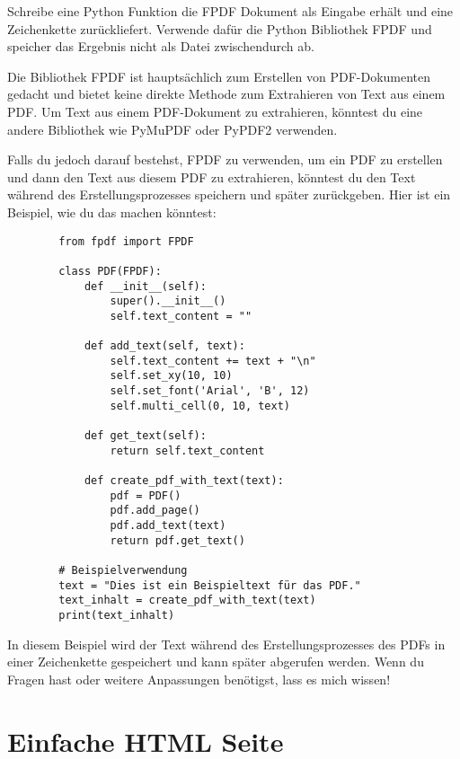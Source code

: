 \newpage

\begin{tcolorbox}[
	enhanced,
	colback=BhtColorYellow!5!white,
	colframe=BhtColorYellow!75!black,
	title= Python Funktion
	]
	Schreibe eine Python Funktion die FPDF Dokument als Eingabe erhält und eine Zeichenkette zurückliefert. Verwende dafür die Python Bibliothek FPDF und speicher das Ergebnis nicht als Datei zwischendurch ab.
\end{tcolorbox}

\begin{tcolorbox}[
	enhanced,
	colback=BhtGrey!5!white,
	colframe=BhtGrey!75!black!50,
	title= Copilot
	]
	Die Bibliothek FPDF ist hauptsächlich zum Erstellen von PDF-Dokumenten gedacht und bietet keine direkte Methode zum Extrahieren von Text aus einem PDF. Um Text aus einem PDF-Dokument zu extrahieren, könntest du eine andere Bibliothek wie PyMuPDF oder PyPDF2 verwenden.
	
	Falls du jedoch darauf bestehst, FPDF zu verwenden, um ein PDF zu erstellen und dann den Text aus diesem PDF zu extrahieren, könntest du den Text während des Erstellungsprozesses speichern und später zurückgeben. Hier ist ein Beispiel, wie du das machen könntest:
	\begin{verbatim}
		from fpdf import FPDF
		
		class PDF(FPDF):
		    def __init__(self):
		        super().__init__()
		        self.text_content = ""
		
		    def add_text(self, text):
		        self.text_content += text + "\n"
		        self.set_xy(10, 10)
		        self.set_font('Arial', 'B', 12)
		        self.multi_cell(0, 10, text)
		
		    def get_text(self):
		        return self.text_content
		
		    def create_pdf_with_text(text):
		        pdf = PDF()
		        pdf.add_page()
		        pdf.add_text(text)
		        return pdf.get_text()
		
		# Beispielverwendung
		text = "Dies ist ein Beispieltext für das PDF."
		text_inhalt = create_pdf_with_text(text)
		print(text_inhalt)
	\end{verbatim}
	In diesem Beispiel wird der Text während des Erstellungsprozesses des PDFs in einer Zeichenkette gespeichert und kann später abgerufen werden. Wenn du Fragen hast oder weitere Anpassungen benötigst, lass es mich wissen!
\end{tcolorbox}

\section{Einfache HTML Seite}
